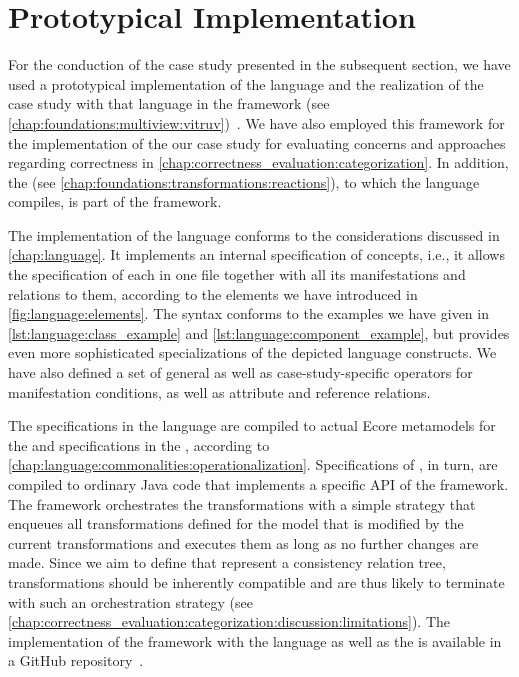 \section{Prototypical Implementation}

For the conduction of the case study presented in the subsequent section, we have used a prototypical implementation of the \commonalities language and the realization of the case study with that language in the \vitruv framework (see \autoref{chap:foundations:multiview:vitruv})~.
We have also employed this framework for the implementation of the our case study for evaluating concerns and approaches regarding correctness in \autoref{chap:correctness_evaluation:categorization}.
In addition, the \reactionslanguage (see \autoref{chap:foundations:transformations:reactions}), to which the \commonalities language compiles, is part of the \vitruv framework.

The implementation of the \commonalities language conforms to the considerations discussed in \autoref{chap:language}.
It implements an internal specification of concepts, i.e., it allows the specification of each \commonality in one file together with all its manifestations and relations to them, according to the elements we have introduced in \autoref{fig:language:elements}.
The syntax conforms to the examples we have given in \autoref{lst:language:class_example} and \autoref{lst:language:component_example}, but provides even more sophisticated specializations of the depicted language constructs.
We have also defined a set of general as well as case-study-specific operators for manifestation conditions, as well as attribute and reference relations.

The specifications in the \commonalities language are compiled to actual Ecore metamodels for the \conceptmetamodels and specifications in the \reactionslanguage, according to \autoref{chap:language:commonalities:operationalization}.
Specifications of \reactions, in turn, are compiled to ordinary Java code that implements a specific \gls{API} of the \vitruv framework.
The framework orchestrates the transformations with a simple strategy that enqueues all transformations defined for the model that is modified by the current transformations and executes them as long as no further changes are made.
Since we aim to define \commonalities that represent a consistency relation tree, transformations should be inherently compatible and are thus likely to terminate with such an orchestration strategy (see \autoref{chap:correctness_evaluation:categorization:discussion:limitations}).
The implementation of the framework with the \commonalities language as well as the \reactionslanguage is available in a GitHub repository~.


